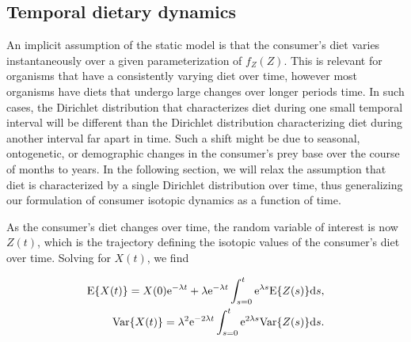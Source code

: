 \documentclass{frontiersSCNS}
\begin{document}





\subsection*{Temporal dietary dynamics}
An implicit assumption of the static model is that the consumer's diet varies instantaneously over a given parameterization of $f_Z(Z)$.
This is relevant for organisms that have a consistently varying diet over time, however most organisms have diets that undergo large changes over longer periods time.
In such cases, the Dirichlet distribution that characterizes diet during one small temporal interval will be different than the Dirichlet distribution characterizing diet during another interval far apart in time.
Such a shift might be due to seasonal, ontogenetic, or demographic changes in the consumer's prey base over the course of months to years.
In the following section, we will relax the assumption that diet is characterized by a single Dirichlet distribution over time, thus generalizing our formulation of consumer isotopic dynamics as a function of time.

As the consumer's diet changes over time, the random variable of interest is now $Z(t)$, which is the trajectory defining the isotopic values of the consumer's diet over time.
Solving for $X(t)$, we find

\begin{align}
  \label{eqEVarZt}
{\rm E}\{X(t)\} = X(0){\rm e}^{-\lambda t} + \lambda{\rm e}^{-\lambda t} \int_{s=0}^t {\rm e}^{\lambda s} {\rm E}\{Z(s)\}{\rm d}s, \nonumber \\
{\rm Var}\{X(t)\} = \lambda^2 {\rm e}^{-2\lambda t} \int_{s=0}^t {\rm e}^{2\lambda s} {\rm Var}\{Z(s)\} {\rm d}s.
\end{align}



\end{document}
